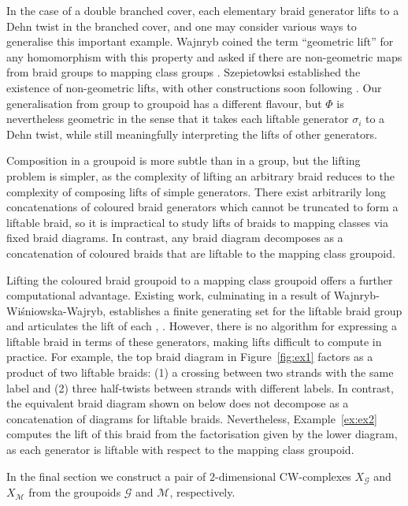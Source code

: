 \documentclass{amsart}
\theoremstyle{definition}
\begin{document}
In the case of a double branched cover, each elementary braid generator lifts to a Dehn twist in the branched cover, and one may consider various ways to generalise this important example.  Wajnryb coined the term ``geometric lift'' for any homomorphism with this property and asked if there are non-geometric maps from braid groups to mapping class groups \cite{Waj1}. Szepietowksi established the existence of non-geometric lifts, with other constructions soon following \cite{Szep} \cite{GM} \cite{BodTill}.  Our generalisation from group to groupoid has a different flavour, but $\Phi$ is nevertheless geometric in the sense that it takes each liftable generator $\sigma_i$ to a Dehn twist, while still meaningfully interpreting the lifts of other generators.  

Composition in a groupoid is more subtle than in a group, but the lifting problem is simpler, as the complexity of lifting an arbitrary braid reduces to the complexity of composing lifts of simple generators. There exist arbitrarily long concatenations of coloured braid generators which cannot be truncated to form a liftable braid, so it is impractical to study lifts of braids to mapping classes via fixed braid diagrams.  In contrast, any braid diagram decomposes as a concatenation of coloured braids that are liftable to the mapping class groupoid. 

Lifting the coloured braid groupoid to a mapping class groupoid offers a further computational advantage.  Existing work, culminating in a result of Wajnryb-Wi\'sniowska-Wajryb, establishes a finite generating set for the liftable braid group and articulates the lift of each \cite{MP}, \cite{WWW} \cite{Apol}.  However, there is no algorithm for expressing a liftable braid in terms of these generators, making lifts difficult to compute in practice.  For example, the top braid diagram in Figure~\ref{fig:ex1} factors as a product of two liftable braids: (1) a crossing between two strands with the same label and (2) three half-twists between strands with different labels.  In contrast, the equivalent braid diagram shown on below does not decompose as a concatenation of diagrams for liftable braids.  Nevertheless, Example~\ref{ex:ex2} computes the lift of this braid from the factorisation given by the lower diagram, as each generator is liftable with respect to the mapping class groupoid.

In the final section we construct a pair of $2$-dimensional CW-complexes $X_\mathcal{G}$ and $X_\mathcal{M}$ from the groupoids $\mathcal{G}$ and $\mathcal{M}$, respectively.
\end{document}
